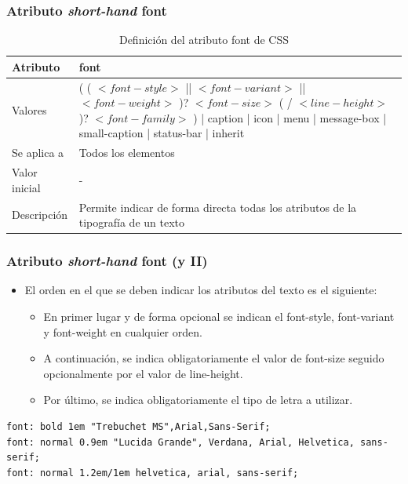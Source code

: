 \documentclass[ucs]{beamer}
\begin{document}
\begin{frame}
\frametitle{Atributo \emph{short-hand} font}

\begin{center}
  \begin{table}
   \begin{tabular}{p{1.8cm}p{7.8cm}}
Atributo & \bf{font} \\ \hline
Valores& ( ( $<font-style>$ || $<font-variant>$ || $<font-weight>$ )? $<font-size>$ ( / $<line-height>$ )? $<font-family>$ ) | caption | icon | menu | message-box | small-caption | status-bar | inherit \\ \hline
Se aplica a& Todos los elementos \\ \hline
Valor inicial& - \\ \hline
Descripción& Permite indicar de forma directa todas los atributos de la tipografía de un texto \\ \hline
  \end{tabular}
   \caption{Definición del atributo font de CSS}
 \end{table}
\end{center}


\end{frame}



\begin{frame}[fragile]
\frametitle{Atributo \emph{short-hand} font (y II)}

\begin{itemize}
  \item El orden en el que se deben indicar los atributos del texto es el siguiente:
  \begin{itemize}
    \item En primer lugar y de forma opcional se indican el font-style, font-variant y font-weight en cualquier orden.
    \item A continuación, se indica obligatoriamente el valor de font-size seguido opcionalmente por el valor de line-height.
    \item Por último, se indica obligatoriamente el tipo de letra a utilizar.
  \end{itemize}
\end{itemize}

\begin{footnotesize}
\begin{verbatim}
font: bold 1em "Trebuchet MS",Arial,Sans-Serif;
font: normal 0.9em "Lucida Grande", Verdana, Arial, Helvetica, sans-serif;
font: normal 1.2em/1em helvetica, arial, sans-serif;
\end{verbatim}
\end{footnotesize}

\end{frame}
\end{document}
